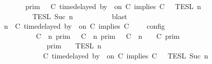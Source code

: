 \begin{isabellebody}
\ \ \ \ \ \ {\isacharequal}\ {\isasymlbrakk}{\isasymlbrakk}\ {\isasymGamma}\ {\isasymrbrakk}{\isasymrbrakk}\isactrlsub p\isactrlsub r\isactrlsub i\isactrlsub m\ {\isasyminter}\ {\isacharparenleft}{\isasymlbrakk}{\isasymlbrakk}\ {\isacharparenleft}C\ time{\isacharminus}delayed\ by\ {\isasymdelta}{\isasymtau}\ on\ C\ implies\ C\ {\isacharhash}\ {\isasymPsi}\ {\isasymrbrakk}{\isasymrbrakk}\isactrlsub T\isactrlsub E\isactrlsub S\isactrlsub L\isactrlbsup {\isasymge}\ n\isactrlesup \isanewline
\ \ \ \ \ \ \ \ {\isasyminter}\ {\isasymlbrakk}{\isasymlbrakk}\ {\isasymPhi}\ {\isasymrbrakk}{\isasymrbrakk}\isactrlsub T\isactrlsub E\isactrlsub S\isactrlsub L\isactrlbsup {\isasymge}\ Suc\ n\isactrlesup {\isacharparenright}{\isacartoucheclose}\isanewline
\ \ \ \ \ \ \isamarkupfalse%
\ {}\ \isamarkupfalse%
\ blast\isanewline
\ \ \ \ \isamarkupfalse%
\ {\isacartoucheopen}{\isasymlbrakk}\ {\isasymGamma}{\isacharcomma}\ n\ {\isasymturnstile}\ {\isacharparenleft}C\ time{\isacharminus}delayed\ by\ {\isasymdelta}{\isasymtau}\ on\ C\ implies\ C\ {\isacharhash}\ {\isasymPsi}\ {\isasymtriangleright}\ {\isasymPhi}\ {\isasymrbrakk}\isactrlsub c\isactrlsub o\isactrlsub n\isactrlsub f\isactrlsub i\isactrlsub g\isanewline
\ \ \ \ \ \ \ \ \ \ {\isacharequal}\ {\isacharparenleft}{\isasymlbrakk}\ C\ {\isasymnot}{\isasymUp}\ n\ {\isasymrbrakk}\isactrlsub p\isactrlsub r\isactrlsub i\isactrlsub m\ {\isasymunion}\ {\isasymlbrakk}\ C\ {\isasymUp}\ n\ {\isasymrbrakk}\isactrlsub p\isactrlsub r\isactrlsub i\isactrlsub m\ {\isasyminter}\ {\isasymlbrakk}\ C\ {\isacharat}\ n\ {\isasymoplus}\ {\isasymdelta}{\isasymtau}\ {\isasymRightarrow}\ C\ {\isasymrbrakk}\isactrlsub p\isactrlsub r\isactrlsub i\isactrlsub m{\isacharparenright}\isanewline
\ \ \ \ \ \ \ \ \ \ \ \ {\isasyminter}\ {\isacharparenleft}{\isasymlbrakk}{\isasymlbrakk}\ {\isasymGamma}\ {\isasymrbrakk}{\isasymrbrakk}\isactrlsub p\isactrlsub r\isactrlsub i\isactrlsub m\ {\isasyminter}\ {\isacharparenleft}{\isasymlbrakk}{\isasymlbrakk}\ {\isasymPsi}\ {\isasymrbrakk}{\isasymrbrakk}\isactrlsub T\isactrlsub E\isactrlsub S\isactrlsub L\isactrlbsup {\isasymge}\ n\isactrlesup \isanewline
\ \ \ \ \ \ \ \ \ \ \ \ {\isasyminter}\ {\isasymlbrakk}{\isasymlbrakk}\ {\isacharparenleft}C\ time{\isacharminus}delayed\ by\ {\isasymdelta}{\isasymtau}\ on\ C\ implies\ C\ {\isacharhash}\ {\isasymPhi}\ {\isasymrbrakk}{\isasymrbrakk}\isactrlsub T\isactrlsub E\isactrlsub S\isactrlsub L\isactrlbsup {\isasymge}\ Suc\ n\isactrlesup {\isacharparenright}{\isacharparenright}{\isacartoucheclose}\isanewline

\end{isabellebody}
